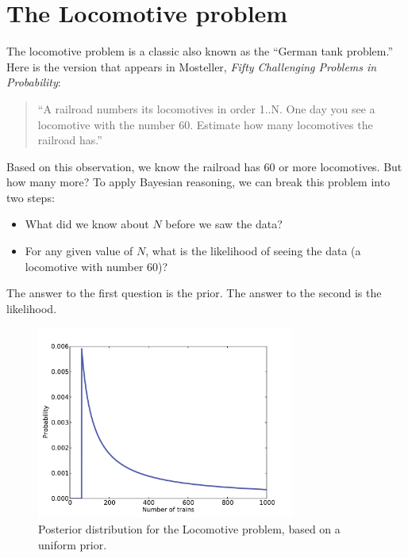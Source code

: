 \documentclass[12pt]{book}
\begin{document}
\section{The Locomotive problem}

The locomotive problem is a classic also
known as the ``German tank problem.''  Here is the version
that appears in Mosteller, {\it Fifty Challenging Problems in
  Probability}:

\begin{quote}
``A railroad numbers its locomotives in order 1..N.  One day you see a
locomotive with the number 60.  Estimate how many locomotives the
railroad has.''
\end{quote}

Based on this observation, we know the railroad has 60 or more
locomotives.  But how many more?  To apply Bayesian reasoning, we
can break this problem into two steps:

\begin{itemize}

\item What did we know about $N$ before we saw the data?

\item For any given value of $N$, what is the likelihood of
seeing the data (a locomotive with number 60)?

\end{itemize}

The answer to the first question is the prior.  The answer to the
second is the likelihood.

\begin{figure}
\centerline{\includegraphics[height=2.5in]{figs/train1.pdf}}
\caption{Posterior distribution for the Locomotive problem, based
on a uniform prior.}
\label{fig.train1}
\end{figure}
\end{document}
